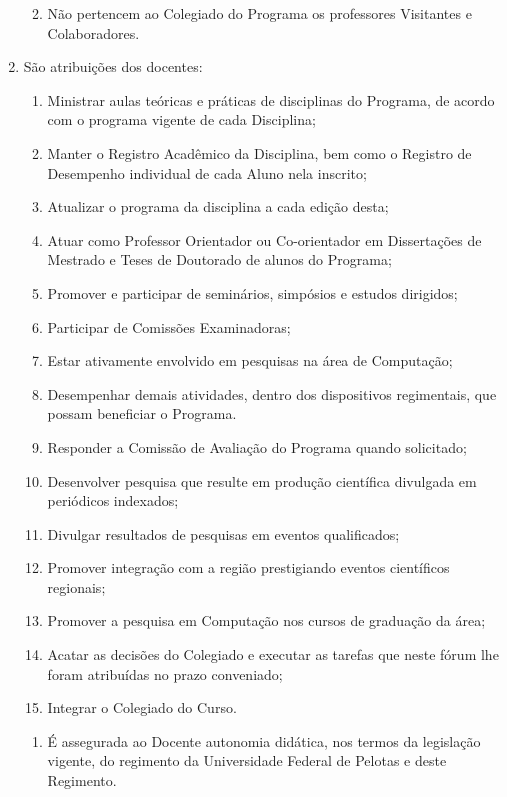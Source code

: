 \documentclass{article}
\newcommand{\singleitem}{\item[Parágrafo Único.]}
\begin{document}
\begin{enumerate}
	\begin{enumerate}
		\singleitem Não pertencem ao Colegiado do Programa os professores Visitantes e Colaboradores. %
	\end{enumerate}
	

	\item São atribuições dos docentes:
	\begin{enumerate}[label=\Roman*]
		\item	Ministrar aulas teóricas e práticas de disciplinas do Programa, de acordo com o programa vigente de cada Disciplina;
		\item	Manter o Registro Acadêmico da Disciplina, bem como o Registro de Desempenho individual de cada Aluno nela inscrito;
		\item	Atualizar o programa da disciplina a cada edição desta;
		\item	Atuar como Professor Orientador ou Co-orientador em Dissertações de Mestrado e Teses de Doutorado de alunos do Programa;
		\item	Promover e participar de seminários, simpósios e estudos dirigidos;
		\item	Participar de Comissões Examinadoras;
		\item	Estar ativamente envolvido em pesquisas na área de Computação;
		\item	Desempenhar demais atividades, dentro dos dispositivos regimentais, que possam beneficiar o Programa. 
		\item	Responder a Comissão de Avaliação do Programa quando solicitado;
		\item	Desenvolver pesquisa que resulte em produção científica divulgada em periódicos indexados;
		\item	Divulgar resultados de pesquisas em eventos qualificados;
		\item	Promover integração com a região prestigiando eventos científicos regionais;
		\item	Promover a pesquisa em Computação nos cursos de graduação da área;
		\item	Acatar as decisões do Colegiado e executar as tarefas que neste fórum lhe foram atribuídas no prazo conveniado;
		\item	Integrar o Colegiado do Curso.
	\end{enumerate}

	\begin{enumerate}
		\singleitem É assegurada ao Docente autonomia didática, nos termos da legislação vigente, do regimento da Universidade Federal de Pelotas e deste Regimento.
	\end{enumerate}

\end{enumerate}
\end{document}
